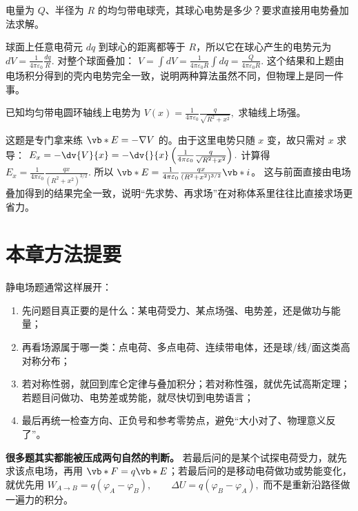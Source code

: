 \documentclass[lang=cn,11pt]{elegantbook}
\begin{document}
\begin{exercise}[用叠加法重算带电球壳球心电势]
电量为 \(Q\)、半径为 \(R\) 的均匀带电球壳，其球心电势是多少？要求直接用电势叠加法求解。
\end{exercise}

\begin{solution}
球面上任意电荷元 \(dq\) 到球心的距离都等于 \(R\)，所以它在球心产生的电势元为
 \(dV=\frac{1}{4\pi\varepsilon_0}\frac{dq}{R}.\) 
对整个球面叠加：
 \(V=\int dV =\frac{1}{4\pi\varepsilon_0R}\int dq =\frac{Q}{4\pi\varepsilon_0R}.\) 
这个结果和上题由电场积分得到的壳内电势完全一致，说明两种算法虽然不同，但物理上是同一件事。
\end{solution}

\begin{exercise}[由电势反推圆环轴线上的场强]
已知均匀带电圆环轴线上电势为
 \(V(x)=\frac{1}{4\pi\varepsilon_0}\frac{q}{\sqrt{R^2+x^2}},\) 
求轴线上场强。
\end{exercise}

\begin{solution}
这题是专门拿来练 \(\vb*{E}=-\nabla V\) 的。由于这里电势只随 \(x\) 变，故只需对 \(x\) 求导：
 \(E_x=-\dv{V}{x} =-\dv{}{x}\left( \frac{1}{4\pi\varepsilon_0}\frac{q}{\sqrt{R^2+x^2}} \right).\) 
计算得
 \(E_x= \frac{1}{4\pi\varepsilon_0} \frac{qx}{(R^2+x^2)^{3/2}}.\) 
所以 \(\vb*{E}=\frac{1}{4\pi\varepsilon_0}\frac{qx}{(R^2+x^2)^{3/2}}\vb*{i}\)。
这与前面直接由电场叠加得到的结果完全一致，说明“先求势、再求场”在对称体系里往往比直接求场更省力。
\end{solution}

\section{本章方法提要}

静电场题通常这样展开：
\begin{enumerate}
 \item 先问题目真正要的是什么：某电荷受力、某点场强、电势差，还是做功与能量；
 \item 再看场源属于哪一类：点电荷、多点电荷、连续带电体，还是球/线/面这类高对称分布；
 \item 若对称性弱，就回到库仑定律与叠加积分；若对称性强，就优先试高斯定理；若题目问做功、电势差或势能，就尽快切到电势语言；
 \item 最后再统一检查方向、正负号和参考零势点，避免“大小对了、物理意义反了”。
\end{enumerate}

\begin{note}
\textbf{很多题其实都能被压成两句自然的判断。} 若最后问的是某个试探电荷受力，就先求该点电场，再用 \(\vb*{F}=q\vb*{E}\)；若最后问的是移动电荷做功或势能变化，就优先用
 \(W_{A\to B}=q(\varphi_A-\varphi_B), \qquad \Delta U=q(\varphi_B-\varphi_A),\) 
而不是重新沿路径做一遍力的积分。
\end{note}
\end{document}
